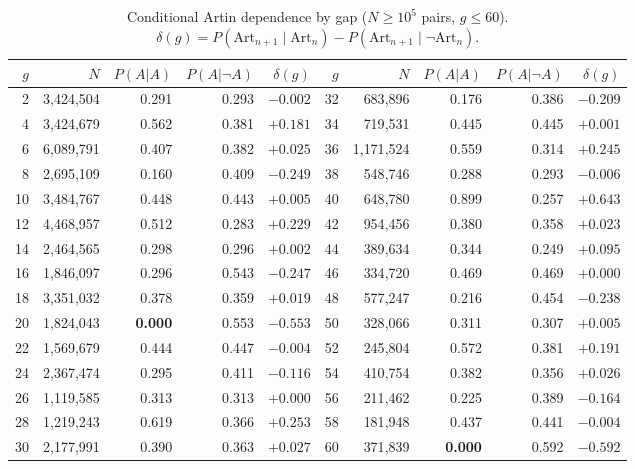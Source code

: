 \documentclass[11pt,reqno]{amsart}
\theoremstyle{plain}
\theoremstyle{definition}
\newcommand{\Art}{\mathrm{Art}}
\begin{document}
\begin{table}[ht]
	\centering
	\caption{Conditional Artin dependence by gap ($N \ge 10^5$ pairs, $g \le 60$).
		$\delta(g) = P(\Art_{n+1} \mid \Art_n) - P(\Art_{n+1} \mid \lnot\Art_n)$.}
	\label{tab:gaps}
	\small
	\begin{tabular}{rrrrr@{\qquad}rrrrr}
		\toprule
		$g$ & $N$           & $P(A|A)$       & $P(A|\lnot A)$ & $\delta(g)$ &
		$g$ & $N$           & $P(A|A)$       & $P(A|\lnot A)$ & $\delta(g)$                                                          \\
		\midrule
		2   & 3{,}424{,}504 & 0.291          & 0.293          & $-0.002$    & 32 & 683{,}896     & 0.176          & 0.386 & $-0.209$ \\
		4   & 3{,}424{,}679 & 0.562          & 0.381          & $+0.181$    & 34 & 719{,}531     & 0.445          & 0.445 & $+0.001$ \\
		6   & 6{,}089{,}791 & 0.407          & 0.382          & $+0.025$    & 36 & 1{,}171{,}524 & 0.559          & 0.314 & $+0.245$ \\
		8   & 2{,}695{,}109 & 0.160          & 0.409          & $-0.249$    & 38 & 548{,}746     & 0.288          & 0.293 & $-0.006$ \\
		10  & 3{,}484{,}767 & 0.448          & 0.443          & $+0.005$    & 40 & 648{,}780     & 0.899          & 0.257 & $+0.643$ \\
		12  & 4{,}468{,}957 & 0.512          & 0.283          & $+0.229$    & 42 & 954{,}456     & 0.380          & 0.358 & $+0.023$ \\
		14  & 2{,}464{,}565 & 0.298          & 0.296          & $+0.002$    & 44 & 389{,}634     & 0.344          & 0.249 & $+0.095$ \\
		16  & 1{,}846{,}097 & 0.296          & 0.543          & $-0.247$    & 46 & 334{,}720     & 0.469          & 0.469 & $+0.000$ \\
		18  & 3{,}351{,}032 & 0.378          & 0.359          & $+0.019$    & 48 & 577{,}247     & 0.216          & 0.454 & $-0.238$ \\
		20  & 1{,}824{,}043 & \textbf{0.000} & 0.553          & $-0.553$    & 50 & 328{,}066     & 0.311          & 0.307 & $+0.005$ \\
		22  & 1{,}569{,}679 & 0.444          & 0.447          & $-0.004$    & 52 & 245{,}804     & 0.572          & 0.381 & $+0.191$ \\
		24  & 2{,}367{,}474 & 0.295          & 0.411          & $-0.116$    & 54 & 410{,}754     & 0.382          & 0.356 & $+0.026$ \\
		26  & 1{,}119{,}585 & 0.313          & 0.313          & $+0.000$    & 56 & 211{,}462     & 0.225          & 0.389 & $-0.164$ \\
		28  & 1{,}219{,}243 & 0.619          & 0.366          & $+0.253$    & 58 & 181{,}948     & 0.437          & 0.441 & $-0.004$ \\
		30  & 2{,}177{,}991 & 0.390          & 0.363          & $+0.027$    & 60 & 371{,}839     & \textbf{0.000} & 0.592 & $-0.592$ \\
		\bottomrule
	\end{tabular}
\end{table}
\end{document}
